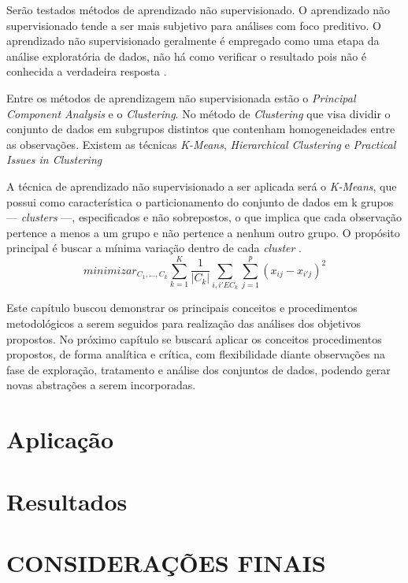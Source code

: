 \documentclass[12pt,openright,oneside,a4paper,chapter=TITLE,section=TITLE,subsection=TITLE,english,french,spanish,portugues,sumario=tradicional]{abntex2}
\begin{document}
Serão testados métodos de aprendizado não supervisionado. O aprendizado não supervisionado tende a ser mais subjetivo para análises com foco preditivo. O aprendizado não supervisionado geralmente é empregado como uma etapa da análise exploratória de dados, não há como verificar o resultado pois não é conhecida a verdadeira resposta \cite{gareth:2017}.

Entre os métodos de aprendizagem não supervisionada estão o \emph{Principal Component Analysis} e o \emph{Clustering}. No método de \emph{Clustering} que visa dividir o conjunto de dados em subgrupos distintos que contenham homogeneidades entre as observações. Existem as técnicas \emph{K-Means}, \emph{Hierarchical Clustering} e \emph{Practical Issues in Clustering} \cite{gareth:2017}

A técnica de aprendizado não supervisionado a ser aplicada será o \emph{K-Means}, que possui como característica o particionamento do conjunto de dados em k grupos --- \emph{clusters} ---, especificados e não sobrepostos, o que implica que cada observação pertence a menos a um grupo e não pertence a nenhum outro grupo. O propósito principal é buscar a mínima variação dentro de cada \emph{cluster} \cite{gareth:2017}.
\[
minimizar_{C_1,...,C_k} \sum_{k = 1}^{K}\frac{1}{|C_k|}\sum_{i,i' E C_k} \sum_{j=1}^{p}(x_{ij} - x_{i'j})^2 
\]

Este capítulo buscou demonstrar os principais conceitos e procedimentos metodológicos a serem seguidos para realização das análises dos objetivos propostos. No próximo capítulo se buscará aplicar os conceitos procedimentos propostos, de forma analítica e crítica, com flexibilidade diante observações na fase de exploração, tratamento e análise dos conjuntos de dados, podendo gerar novas abstrações a serem incorporadas.

\chapter{Aplicação}

\chapter{Resultados}


\chapter*[Conclusão]{CONSIDERAÇÕES FINAIS}
\end{document}
